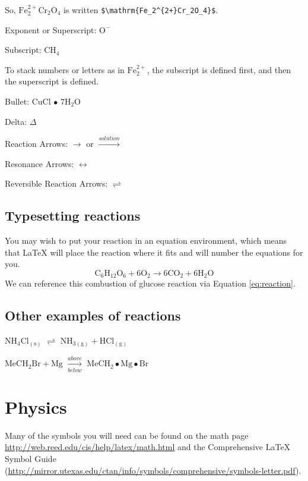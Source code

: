 \documentclass [11pt, proquest] {uwthesis}[2015/03/03]
\begin{document}
So, \(\mathrm{Fe_2^{2+}Cr_2O_4}\) is written
\texttt{\$\textbackslash{}mathrm\{Fe\_2\^{}\{2+\}Cr\_2O\_4\}\$}.

\noindent Exponent or Superscript: \(\mathrm{O^-}\)

\noindent Subscript: \(\mathrm{CH_4}\)

To stack numbers or letters as in \(\mathrm{Fe_2^{2+}}\), the subscript
is defined first, and then the superscript is defined.

\noindent Bullet: CuCl \(\bullet\) \(\mathrm{7H_{2}O}\)

\noindent Delta: \(\Delta\)

\noindent Reaction Arrows: \(\longrightarrow\) or
\(\xrightarrow{solution}\)

\noindent Resonance Arrows: \(\leftrightarrow\)

\noindent Reversible Reaction Arrows: \(\rightleftharpoons\)

\subsection{Typesetting reactions}\label{typesetting-reactions}

You may wish to put your reaction in an equation environment, which
means that LaTeX will place the reaction where it fits and will number
the equations for you.
\begin{equation}
  \mathrm{C_6H_{12}O_6  + 6O_2} \longrightarrow \mathrm{6CO_2 + 6H_2O}
  \label{eq:reaction}
\end{equation}
We can reference this combustion of glucose reaction via Equation
\eqref{eq:reaction}.

\subsection{Other examples of
reactions}\label{other-examples-of-reactions}

\(\mathrm{NH_4Cl_{(s)}}\) \(\rightleftharpoons\)
\(\mathrm{NH_{3(g)}+HCl_{(g)}}\)

\noindent \(\mathrm{MeCH_2Br + Mg}\) \(\xrightarrow[below]{above}\)
\(\mathrm{MeCH_2\bullet Mg \bullet Br}\)

\section{Physics}\label{physics}

Many of the symbols you will need can be found on the math page
\url{http://web.reed.edu/cis/help/latex/math.html} and the Comprehensive
LaTeX Symbol Guide
(\url{http://mirror.utexas.edu/ctan/info/symbols/comprehensive/symbols-letter.pdf}).
\end{document}
